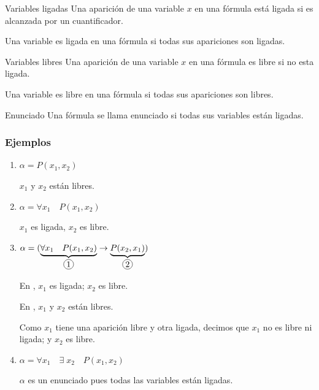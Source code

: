 \begin{definicion}{Variables ligadas}{}
    Una aparición de una variable $x$ en una fórmula está ligada si es 
    alcanzada por un cuantificador.

    \smallskip

    Una variable es ligada en una fórmula si todas sus apariciones son ligadas.

\end{definicion}

\medskip

\begin{definicion}{Variables libres}{}
    Una aparición de una variable $x$ en una fórmula es libre si no esta
    ligada. 

    \smallskip

    Una variable es libre en una fórmula si todas sus apariciones son libres.
\end{definicion}

\medskip

\begin{definicion}{Enunciado}{}
    Una fórmula se llama enunciado si todas sus variables están ligadas.
\end{definicion}


\subsubsection{Ejemplos}

\begin{enumerate}
    \item $\alpha = P(x_1, x_2)$

        $x_1$ y $x_2$ están libres.

    \item $\alpha = \forall x_1 \quad P(x_1, x_2)$

        $x_1$ es ligada, $x_2$ es libre.

    \item $\alpha = (\underbrace{\forall x_1 \quad P(x_1, x_2)}_{\circled{1}}
        \to \underbrace{P(x_2, x_1)}_{\circled{2}})$

        En , $x_1$ es ligada; $x_2$ es libre.

        En , $x_1$ y $x_2$ están libres.

        Como $x_1$ tiene una aparición libre y otra ligada, decimos que $x_1$
        no es libre ni ligada; y $x_2$ es libre.

    \item $\alpha = \forall x_1 \quad \exists\; x_2 \quad P(x_1, x_2)$

        $\alpha$ es un enunciado pues todas las variables están ligadas.
\end{enumerate}

